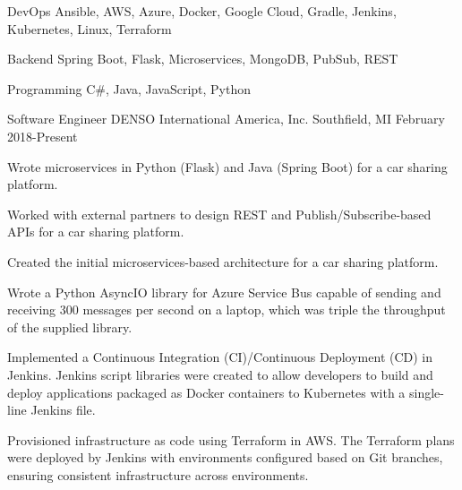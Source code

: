 \documentclass[11pt, a4paper]{awesome-cv}
\begin{document}
\makecvheader[C]


\begin{cvskills}
    \cvskill
    {DevOps}
    {Ansible, AWS, Azure, Docker, Google Cloud, Gradle, Jenkins, Kubernetes, Linux, Terraform}

    \cvskill
    {Backend}
    {Spring Boot, Flask, Microservices, MongoDB, PubSub, REST}

    \cvskill
    {Programming}
    {C\#, Java, JavaScript, Python}
\end{cvskills}

\begin{cventries}
    \cventry
    {Software Engineer}
    {DENSO International America, Inc.}
    {Southfield, MI}
    {February 2018-Present}
    {
        \begin{cvitems}
            \item{Wrote microservices in Python (Flask) and Java (Spring Boot) for a car sharing platform.}
            \item{Worked with external partners to design REST and Publish/Subscribe-based APIs for a car sharing platform.}
            \item{Created the initial microservices-based architecture for a car sharing platform.}
            \item{Wrote a Python AsyncIO library for Azure Service Bus capable of sending and receiving 300 messages per second on a laptop, which was triple the throughput of the supplied library.}
            \item{Implemented a Continuous Integration (CI)/Continuous Deployment (CD) in Jenkins. Jenkins script libraries were created to allow developers to build and deploy applications packaged as Docker containers to Kubernetes with a single-line Jenkins file.}
            \item{Provisioned infrastructure as code using Terraform in AWS. The Terraform plans were deployed by Jenkins with environments configured based on Git branches, ensuring consistent infrastructure across environments.}
        \end{cvitems}
    }


\end{cventries}
\end{document}
